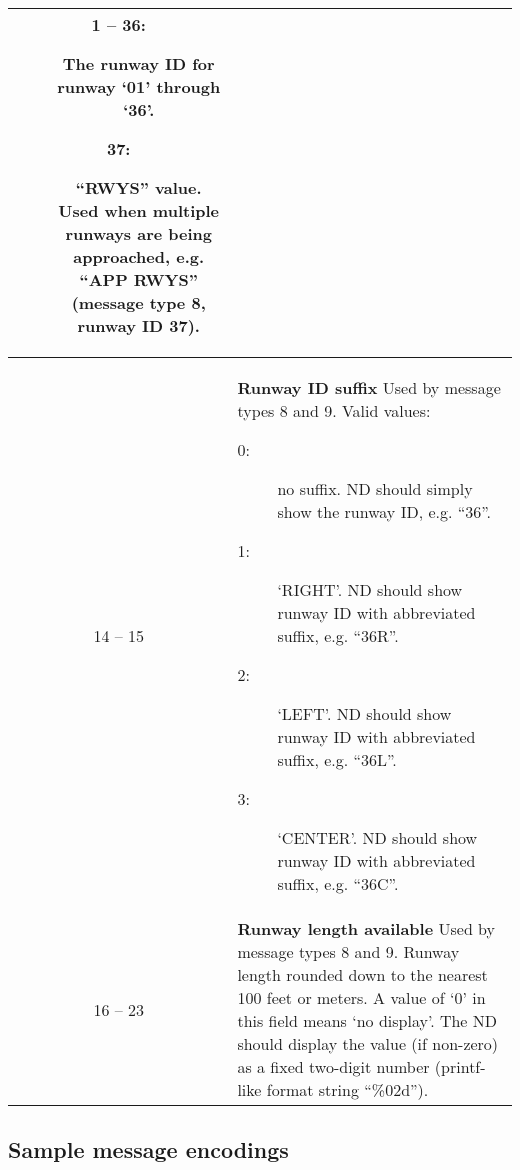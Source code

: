 \documentclass[a4paper,12pt]{article}
\begin{document}
\begin{appendix}
{\begin{center}
\begin{supertabular}{|c|p{13.5cm}|}
\begin{description}
\item[1 -- 36:] The runway ID for runway `01' through `36'.

\item[37:] ``RWYS'' value. Used when multiple runways are being
approached, e.g. ``APP RWYS'' (message type 8, runway ID 37).

\end{description} \\

\hline

14 -- 15 &
\textbf{Runway ID suffix}\newline
Used by message types 8 and 9. Valid values:

\begin{description}


\item[0:] no suffix. ND should simply show the runway ID, e.g. ``36''.

\item[1:] `RIGHT'. ND should show runway ID with abbreviated suffix, e.g.
``36R''.

\item[2:] `LEFT'. ND should show runway ID with abbreviated suffix, e.g.
``36L''.

\item[3:] `CENTER'. ND should show runway ID with abbreviated suffix,
e.g. ``36C''.

\end{description} \\

\hline

16 -- 23 &
\textbf{Runway length available}\newline
Used by message types 8 and 9. Runway length rounded down to the nearest
100 feet or meters. A value of `0' in this field means `no display'. The
ND should display the value (if non-zero) as a fixed two-digit number
(printf-like format string ``\%02d''). \\

\end{supertabular}
\end{center}
} %

\newpage
\subsection{Sample message encodings}

{\small
\begin{center}

\begin{tabular}{|p{}|p{}|c|}


\end{tabular}
\end{center}}
\end{appendix}
\end{document}

